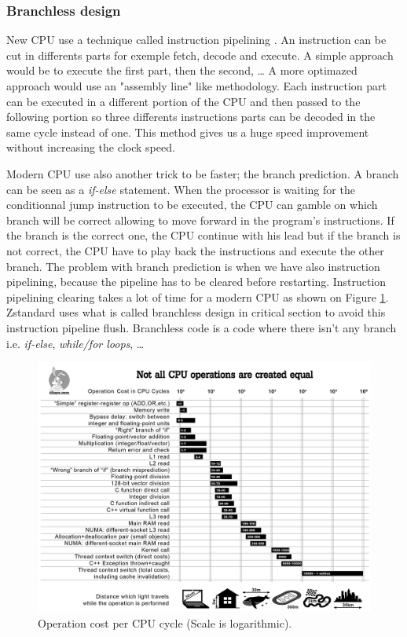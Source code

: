 \documentclass{sig-alternate-05-2015}
\begin{document}
    \subsubsection{Branchless design}
        New CPU use a technique called instruction pipelining \cite{pipelining}. An instruction can be
        cut in differents parts for exemple fetch, decode and execute. A simple approach would be to
        execute the first part, then the second, \ldots{} A more optimazed approach would use an
        "assembly line" like methodology. Each instruction part can be executed in a different
        portion of the CPU and then passed to the following portion so three differents instructions
        parts can be decoded in the same cycle instead of one. This method gives us a huge speed
        improvement without increasing the clock speed.

        Modern CPU use also another trick to be faster; the branch prediction. A branch can be seen
        as a \textit{if-else} statement. When the processor is waiting for the conditionnal jump
        instruction to be executed, the CPU can gamble on which branch will be correct allowing to
        move forward in the program's instructions. If the branch is the correct one, the CPU
        continue with his lead but if the branch is not correct, the CPU have to play back the
        instructions and execute the other branch. The problem with branch prediction is when we
        have also instruction pipelining, because the pipeline has to be cleared before restarting.
        Instruction pipelining clearing takes a lot of time for a modern CPU as shown on Figure
        \ref{fig:costop}. Zstandard uses what is called branchless design in critical section to
        avoid this instruction pipeline flush. Branchless code is a code where there isn't any
        branch i.e. \textit{if-else}, \textit{while/for loops}, \ldots

        \begin{figure}
            \centerline{\includegraphics[scale=0.11]{figure/costCPUop.png}}
            \caption{Operation cost per CPU cycle (Scale is logarithmic).}
            \label{fig:costop}
        \end{figure}
\end{document}
